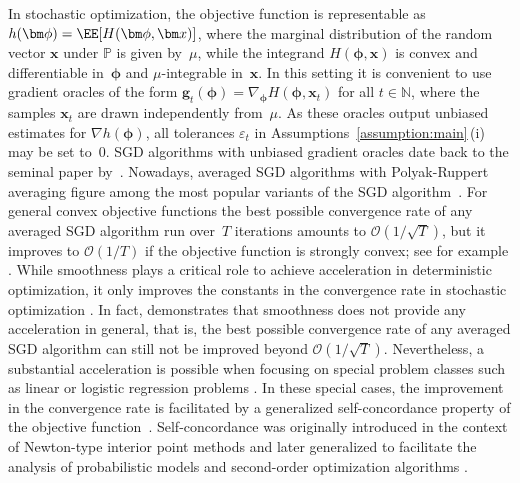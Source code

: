 \documentclass[11pt, a4paper, oneside, reqno]{article}
\begin{document}
	In stochastic optimization, the objective function is representable as $h(\bm \phi) = \EE [H(\bm \phi, \bm x)]$, where the marginal distribution of the random vector $\bm x$ under $\mathbb P$ is given by~$\mu$, while the integrand $H(\bm \phi,\bm x)$ is convex and differentiable in~$\bm \phi$ and $\mu$-integrable in~$\bm x$. In this setting it is convenient to use gradient oracles of the form $\bm g_t(\bm \phi) = \nabla_{\bm \phi} H(\bm \phi, \bm x_t)$ for all $t \in \mathbb N$, where the samples $\bm x_t$ are drawn independently from~$\mu$. As these oracles output unbiased estimates for $\nabla h(\bm \phi)$, all tolerances $\varepsilon_t$ in Assumptions~\ref{assumption:main}\,(i) may be set to~$0$. SGD algorithms with unbiased gradient oracles date back to the seminal paper by~\citet{robbins1951stochastic}. Nowadays, averaged SGD algorithms with Polyak-Ruppert averaging figure among the most popular variants of the SGD algorithm~\citep{ruppert1988efficient, polyak1992acceleration, nemirovski2009robust}. For general convex objective functions the best possible convergence rate of any averaged SGD algorithm run over~$T$ iterations amounts to $\mathcal{O}(1 / \sqrt{T})$, but it improves to $\mathcal{O}(1 / T)$ if the objective function is strongly convex; see for example \citep{nesterov2008confidence, nemirovski2009robust, shalev2009stochastic, duchi2009efficient, xiao2010dual, moulines2011non, shalev2011pegasos, lacoste2012simpler}.
	While smoothness plays a critical role to achieve acceleration in deterministic optimization, it only improves the constants in the convergence rate in stochastic optimization \citep{srebro2010optimistic, dekel2012optimal, lan2012optimal, cohen2018acceleration, kavis2019unixgrad}.
	In fact, \citet{tsybakov2003optimal} demonstrates that smoothness does not provide any acceleration in general, that is, the best possible convergence rate of any averaged SGD algorithm can still not be improved beyond $\mathcal{O}(1 / \sqrt{T})$. Nevertheless, a substantial acceleration is possible when focusing on special problem classes such as linear or logistic regression problems \citep{bach2013adaptivity, bach2013non, hazan2014logistic}. In these special cases, the improvement in the convergence rate is facilitated by a generalized self-concordance property of the objective function~\citep{bach2010self}.
	Self-concordance was originally introduced in the context of Newton-type interior point methods \citep{nesterov1994interior} and later generalized to facilitate the analysis of probabilistic models \citep{bach2010self} and second-order optimization algorithms \citep{sun2019generalized}.
	
\end{document}
